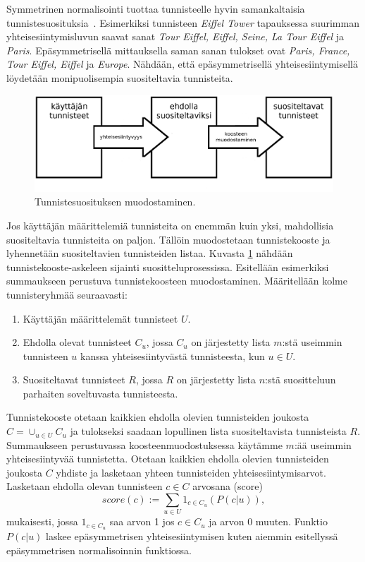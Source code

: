 \documentclass[12pt,finnish]{tktltiki2}
\theoremstyle{definition}
\theoremstyle{remark}
\begin{document}
Symmetrinen normalisointi tuottaa tunnisteelle hyvin samankaltaisia tunnistesuosituksia~\cite{Sigurbjornsson:2008:FTR:1367497.1367542}. Esimerkiksi tunnisteen \textit{Eiffel Tower} tapauksessa suurimman yhteisesiintymisluvun saavat sanat \textit{Tour Eiffel, Eiffel, Seine, La Tour Eiffel} ja \textit{Paris}. Epäsymmetrisellä mittauksella saman sanan tulokset ovat \textit{Paris, France, Tour Eiffel, Eiffel} ja \textit{Europe}. Nähdään, että epäsymmetrisellä yhteisesiintymisellä löydetään monipuolisempia suositeltavia tunnisteita.

\begin{figure}[]
\includegraphics[width = 420pt]{tunnisteidensuosittelu.eps}\caption{Tunnistesuosituksen muodostaminen.}
\label{tunnisteidensuosittelu}
\end{figure}

Jos käyttäjän määrittelemiä tunnisteita on enemmän kuin yksi, mahdollisia suositeltavia tunnisteita on paljon. Tällöin muodostetaan tunnistekooste ja lyhennetään suositeltavien tunnisteiden listaa. Kuvasta \ref{tunnisteidensuosittelu} nähdään tunnistekooste-askeleen sijainti suositteluprosessissa.
Esitellään esimerkiksi summaukseen perustuva tunnistekoosteen muodostaminen. Määritellään kolme tunnisteryhmää seuraavasti:
\begin{enumerate}
\item Käyttäjän määrittelemät tunnisteet $U$.

\item Ehdolla olevat tunnisteet $C_{u}$, jossa $C_{u}$ on järjestetty lista $m$:stä useimmin tunnisteen $u$ kanssa yhteisesiintyvästä tunnisteesta, kun $u \in U$.

\item Suositeltavat tunnisteet $R$, jossa $R$ on järjestetty lista $n$:stä suositteluun parhaiten soveltuvasta tunnisteesta.
\end{enumerate}

Tunnistekooste otetaan kaikkien ehdolla olevien tunnisteiden joukosta $C = \cup_{u\in U}C_u$ ja tulokseksi saadaan lopullinen lista suositeltavista tunnisteista $R$. Summaukseen perustuvassa koosteenmuodostuksessa käytämme $m$:ää useimmin yhteisesiintyvää tunnistetta. Otetaan kaikkien ehdolla olevien tunnisteiden joukosta $C$ yhdiste ja lasketaan yhteen tunnisteiden yhteisesiintymisarvot. Lasketaan ehdolla olevan tunnisteen $c \in C$ arvosana (score)
\begin{displaymath}
score(c) := \sum_{u\in U}1_{c\in C_u}(P(c|u)),
\end{displaymath}
mukaisesti, jossa $1_{c\in C_u}$ saa arvon 1 jos $c\in C_u$ ja arvon 0 muuten. Funktio $P(c|u)$ laskee epäsymmetrisen yhteisesiintymisen kuten aiemmin esitellyssä epäsymmetrisen normalisoinnin funktiossa.
\end{document}
